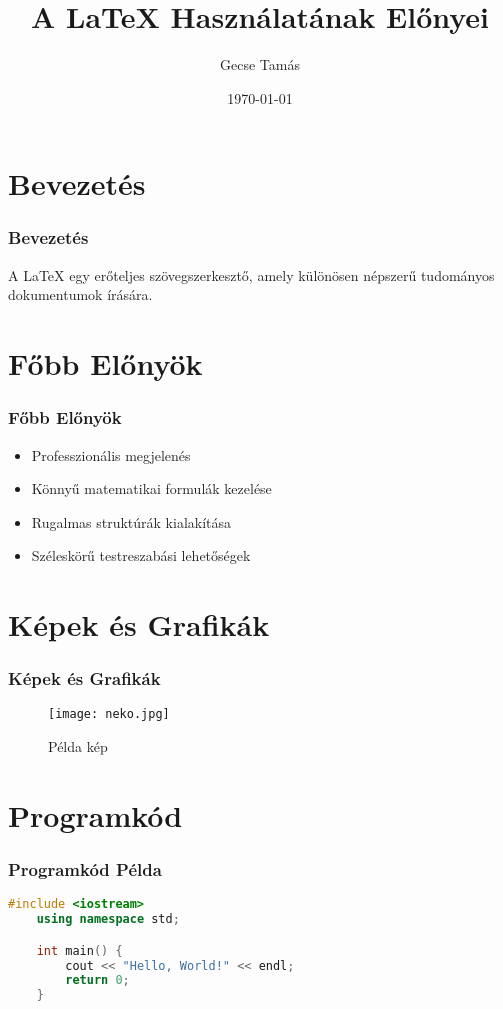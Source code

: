 \documentclass{beamer}
\title{A LaTeX Használatának Előnyei}
\author{Gecse Tamás}
\date{\today}
\begin{document}
\begin{frame}
    \titlepage
\end{frame}

\begin{frame}
    \tableofcontents
\end{frame}

\section{Bevezetés}
\begin{frame}
    \frametitle{Bevezetés}
    A LaTeX egy erőteljes szövegszerkesztő, amely különösen népszerű tudományos dokumentumok írására.
\end{frame}

\section{Főbb Előnyök}
\begin{frame}
    \frametitle{Főbb Előnyök}
    \begin{itemize}
        \item Professzionális megjelenés
        \item Könnyű matematikai formulák kezelése
        \item Rugalmas struktúrák kialakítása
        \item Széleskörű testreszabási lehetőségek
    \end{itemize}
\end{frame}

\section{Képek és Grafikák}
\begin{frame}
    \frametitle{Képek és Grafikák}
    \begin{figure}
        \centering
        \texttt{[image: neko.jpg]}
        \caption{Példa kép}
    \end{figure}
\end{frame}

\section{Programkód}
\begin{frame}[fragile]
    \frametitle{Programkód Példa}
    \begin{lstlisting}[language=C++, caption=Hello World C++ Program]
    #include <iostream>
    using namespace std;

    int main() {
        cout << "Hello, World!" << endl;
        return 0;
    }
    \end{lstlisting}
\end{frame}
\end{document}
